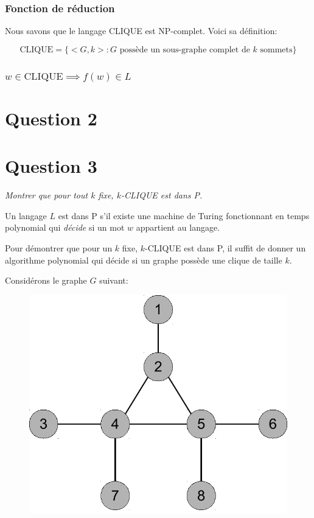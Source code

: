 \documentclass[10pt]{article}
\begin{document}
\subsubsection{Fonction de réduction}

Nous savons que le langage CLIQUE est NP-complet.  Voici sa
définition:

\[
\text{CLIQUE} = \{ <G, k> : G \text{ possède un sous-graphe complet de
  $k$ sommets} \}
\]


\subsubsection{$w \in \text{CLIQUE} \implies f(w) \in L$}



\section{Question 2}


\newpage

\section{Question 3}

\emph{Montrer que pour tout $k$ fixe, $k$-CLIQUE est dans P.}

Un langage $L$ est dans P s'il existe une machine de Turing
fonctionnant en temps polynomial qui \emph{décide} si un mot $w$
appartient au langage.

Pour démontrer que pour un $k$ fixe, $k$-CLIQUE est dans P, il suffit
de donner un algorithme polynomial qui décide si un graphe possède une
clique de taille $k$.

Considérons le graphe $G$ suivant:

\begin{figure}[h]
  \centering
  \includegraphics[scale=0.4]{graphe3}
\end{figure}
\end{document}
